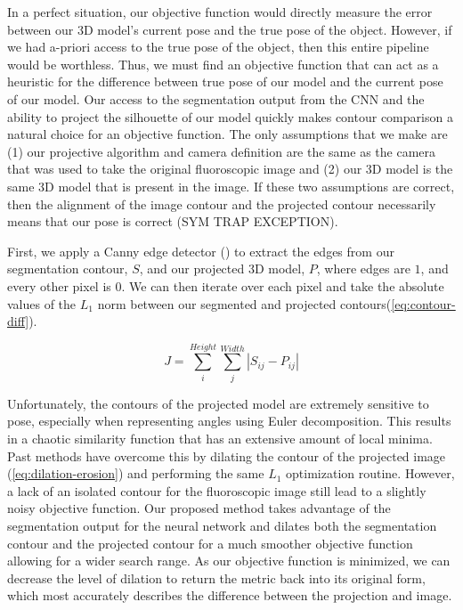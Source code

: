 In a perfect situation, our objective function would directly measure the error between our 3D model's current pose and the true pose of the object. However, if we had a-priori access to the true pose of the object, then this entire pipeline would be worthless. Thus, we must find an objective function that can act as a heuristic for the difference between true pose of our model and the current pose of our model. Our access to the segmentation output from the CNN and the ability to project the silhouette of our model quickly makes contour comparison a natural choice for an objective function. The only assumptions that we make are (1) our projective algorithm and camera definition are the same as the camera that was used to take the original fluoroscopic image and (2) our 3D model is the same 3D model that is present in the image. If these two assumptions are correct, then the alignment of the image contour and the projected contour necessarily means that our pose is correct (SYM TRAP EXCEPTION).

First, we apply a Canny edge detector (\cite{cannyComputationalApproachEdge1986}) to extract the edges from our segmentation contour, $S$, and our projected 3D model, $P$, where edges are $1$, and every other pixel is $0$. We can then iterate over each pixel and take the absolute values of the $L_1$ norm between our segmented and projected contours(\cref{eq:contour-diff}).

\begin{equation}
    J = \sum_i^{Height}\sum_j^{Width}|S_{ij} - P_{ij}|
    \label{eq:contour-diff}
\end{equation}

Unfortunately, the contours of the projected model are extremely sensitive to pose, especially when representing angles using Euler decomposition. This results in a chaotic similarity function that has an extensive amount of local minima. Past methods have overcome this by dilating the contour of the projected image (\cref{eq:dilation-erosion}) and performing the same $L_1$ optimization routine. However, a lack of an isolated contour for the fluoroscopic image still lead to a slightly noisy objective function. Our proposed method takes advantage of the segmentation output for the neural network and dilates both the segmentation contour and the projected contour for a much smoother objective function allowing for a wider search range. As our objective function is minimized, we can decrease the level of dilation to return the metric back into its original form, which most accurately describes the difference between the projection and image.